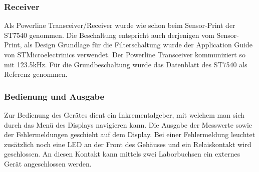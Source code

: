 \subsubsection{Receiver}
Als Powerline Transceiver/Receiver wurde wie schon beim Sensor-Print der ST7540 genommen. Die Beschaltung entspricht auch derjenigen vom Sensor-Print, als Design Grundlage für die Filterschaltung wurde der Application Guide \cite[p. 48]{Applic_Guide_ST7540} von STMicroelectrinics verwendet. Der Powerline Transceiver kommuniziert so mit 123.5kHz. Für die Grundbeschaltung wurde das Datenblatt des ST7540 \cite[p. 40]{Datasheet_ST7540} als Referenz genommen.

\subsubsection{Bedienung und Ausgabe}
Zur Bedienung des Gerätes dient ein Inkrementalgeber, mit welchem man sich durch das Menü des Displays navigieren kann. Die Ausgabe der Messwerte sowie der Fehlermeldungen geschieht auf dem Display. Bei einer Fehlermeldung leuchtet zusätzlich noch eine LED an der Front des Gehäuses und ein Relaiskontakt wird geschlossen. An diesen Kontakt kann mittels zwei Laborbuchsen ein externes Gerät angeschlossen werden.

